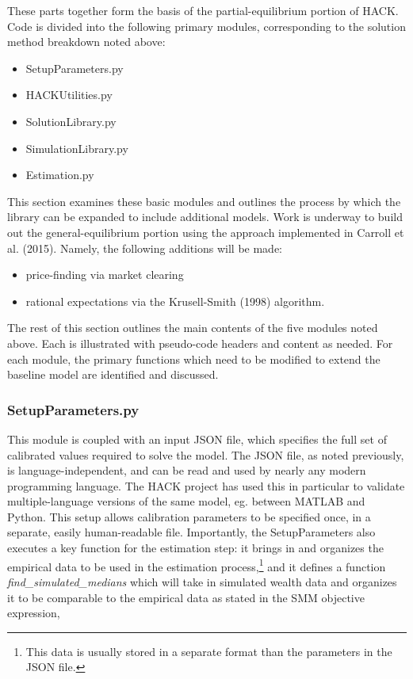 \documentclass[]{article}
\begin{document}
These parts together form the basis of the partial-equilibrium portion
of HACK. Code is divided into the following primary modules,
corresponding to the solution method breakdown noted above:

\begin{itemize}
\itemsep1pt\parskip0pt
\item
  SetupParameters.py
\item
  HACKUtilities.py
\item
  SolutionLibrary.py
\item
  SimulationLibrary.py
\item
  Estimation.py
\end{itemize}

This section examines these basic modules and outlines the process by
which the library can be expanded to include additional models. Work is
underway to build out the general-equilibrium portion using the approach
implemented in Carroll et al. (2015). Namely, the following additions
will be made:

\begin{itemize}
\itemsep1pt\parskip0pt
\item
  price-finding via market clearing
\item
  rational expectations via the Krusell-Smith (1998) algorithm.
\end{itemize}

The rest of this section outlines the main contents of the five modules
noted above. Each is illustrated with pseudo-code headers and content as
needed. For each module, the primary functions which need to be modified
to extend the baseline model are identified and discussed.

\subsubsection{SetupParameters.py}\label{setupparameters.py}

This module is coupled with an input JSON file, which specifies the full
set of calibrated values required to solve the model. The JSON file, as
noted previously, is language-independent, and can be read and used by
nearly any modern programming language. The HACK project has used this
in particular to validate multiple-language versions of the same model,
eg. between MATLAB and Python. This setup allows calibration parameters
to be specified once, in a separate, easily human-readable file.
Importantly, the SetupParameters also executes a key function for the
estimation step: it brings in and organizes the empirical data to be
used in the estimation process,\footnote{This data is usually stored in
  a separate format than the parameters in the JSON file.} and it
defines a function \emph{find\_simulated\_medians} which will take in
simulated wealth data and organizes it to be comparable to the empirical
data as stated in the SMM objective expression,
\end{document}
